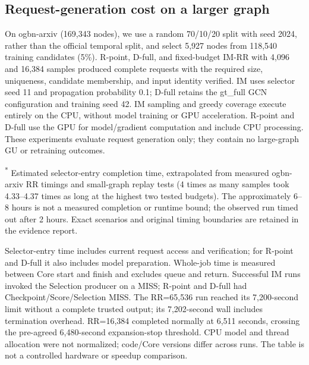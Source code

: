 \subsection{Request-generation cost on a larger graph}
\label{app:arxiv-selector-cost}
On ogbn-arxiv (169,343 nodes), we use a random 70/10/20 split with seed 2024, rather than the official temporal split, and select 5,927 nodes from 118,540 training candidates (5\%). R-point, D-full, and fixed-budget IM-RR with 4,096 and 16,384 samples produced complete requests with the required size, uniqueness, candidate membership, and input identity verified. IM uses selector seed 11 and propagation probability 0.1; D-full retains the gt\_full GCN configuration and training seed 42. IM sampling and greedy coverage execute entirely on the CPU, without model training or GPU acceleration. R-point and D-full use the GPU for model/gradient computation and include CPU processing. These experiments evaluate request generation only; they contain no large-graph GU or retraining outcomes.

\begin{table}[t]
\centering\small
\caption{Request-generation costs on ogbn-arxiv. Times are measured except the starred estimate; entry and whole-job times have different boundaries.}
\label{tab:arxiv-selector-cost}

\par\smallskip
\begin{minipage}{\textwidth}\footnotesize
\textsuperscript{*} Estimated selector-entry completion time, extrapolated from measured ogbn-arxiv RR timings and small-graph replay tests (4 times as many samples took 4.33--4.37 times as long at the highest two tested budgets). The approximately 6--8 hours is not a measured completion or runtime bound; the observed run timed out after 2 hours. Exact scenarios and original timing boundaries are retained in the evidence report.
\end{minipage}
\end{table}

Selector-entry time includes current request access and verification; for R-point and D-full it also includes model preparation. Whole-job time is measured between Core start and finish and excludes queue and return. Successful IM runs invoked the Selection producer on a MISS; R-point and D-full had Checkpoint/Score/Selection MISS. The RR=65,536 run reached its 7,200-second limit without a complete trusted output; its 7,202-second wall includes termination overhead. RR=16,384 completed normally at 6,511 seconds, crossing the pre-agreed 6,480-second expansion-stop threshold. CPU model and thread allocation were not normalized; code/Core versions differ across runs. The table is not a controlled hardware or speedup comparison.
